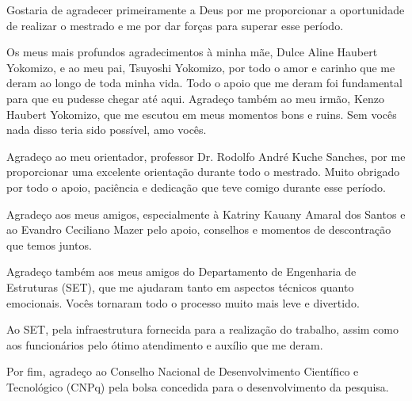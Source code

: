 \begin{agradecimentos}

    Gostaria de agradecer primeiramente a Deus por me proporcionar a oportunidade de realizar o mestrado e me por dar forças para superar esse período.

    Os meus mais profundos agradecimentos à minha mãe, Dulce Aline Haubert Yokomizo, e ao meu pai, Tsuyoshi Yokomizo, por todo o amor e carinho que me deram ao longo de toda minha vida. Todo o apoio que me deram foi fundamental para que eu pudesse chegar até aqui. Agradeço também ao meu irmão, Kenzo Haubert Yokomizo, que me escutou em meus momentos bons e ruins. Sem vocês nada disso teria sido possível, amo vocês.

    Agradeço ao meu orientador, professor Dr. Rodolfo André Kuche Sanches, por me proporcionar uma excelente orientação durante todo o mestrado. Muito obrigado por todo o apoio, paciência e dedicação que teve comigo durante esse período.

    Agradeço aos meus amigos, especialmente à Katriny Kauany Amaral dos Santos e ao Evandro Ceciliano Mazer pelo apoio, conselhos e momentos de descontração que temos juntos.

    Agradeço também aos meus amigos do Departamento de Engenharia de Estruturas (SET), que me ajudaram tanto em aspectos técnicos quanto emocionais. Vocês tornaram todo o processo muito mais leve e divertido.

    Ao SET, pela infraestrutura fornecida para a realização do trabalho, assim como aos funcionários pelo ótimo atendimento e auxílio que me deram.

    Por fim, agradeço ao Conselho Nacional de Desenvolvimento Científico e Tecnológico (CNPq) pela bolsa concedida para o desenvolvimento da pesquisa.

\end{agradecimentos}